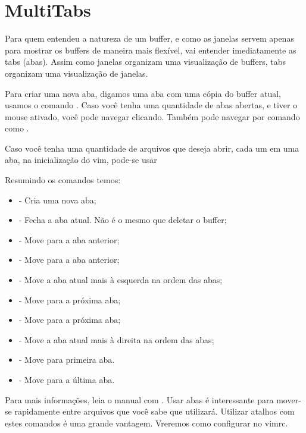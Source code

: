 
\section{MultiTabs}
Para quem entendeu a natureza de um buffer, e como as janelas servem apenas para mostrar os buffers
de maneira mais flexível, vai entender imediatamente as tabs (abas).
Assim como janelas organizam uma visualização de buffers, tabs organizam uma visualização de janelas.

Para criar uma nova aba, digamos uma aba com uma cópia do buffer atual, usamos o comando .
Caso você tenha uma quantidade de abas abertas, e tiver o mouse ativado, você pode navegar clicando.
Também pode navegar por comando como .

Caso você tenha uma quantidade de arquivos que deseja abrir, cada um em uma aba, na inicialização do vim,
pode-se usar 

Resumindo os comandos temos:
\begin{itemize}
    \item {} - Cria uma nova aba;
    \item {} - Fecha a aba atual. Não é o mesmo que deletar o buffer;
    \item {} - Move para a aba anterior;
    \item {} - Move para a aba anterior;
    \item {} - Move a aba atual mais à esquerda na ordem das abas;
    \item {} - Move para a próxima aba;
    \item {} - Move para a próxima aba;
    \item {} - Move a aba atual mais à direita na ordem das abas;
    \item {} - Move para primeira aba.
    \item {} - Move para a última aba.
\end{itemize}


Para mais informações, leia o manual com .
Usar abas é interessante para mover-se rapidamente entre arquivos que você sabe que utilizará.
Utilizar atalhos com estes comandos é uma grande vantagem.
Vreremos como configurar no vimrc.

